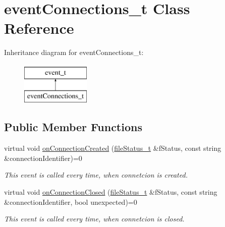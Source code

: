 \hypertarget{classeventConnections__t}{\section{event\-Connections\-\_\-t \-Class \-Reference}
\label{classeventConnections__t}
}
\-Inheritance diagram for event\-Connections\-\_\-t\-:\begin{figure}[H]
\begin{center}
\leavevmode
\includegraphics[height=2.000000cm]{classeventConnections__t}
\end{center}
\end{figure}
\subsection*{\-Public \-Member \-Functions}
\begin{DoxyCompactItemize}
\item 
virtual void \hyperlink{classeventConnections__t_a325741f899797da5c563ba8bc821daf5}{on\-Connection\-Created} (\hyperlink{classfileStatus__t}{file\-Status\-\_\-t} \&f\-Status, const string \&connection\-Identifier)=0
\begin{DoxyCompactList}\small\item\em \-This event is called every time, when connetcion is created. \end{DoxyCompactList}\item 
virtual void \hyperlink{classeventConnections__t_a05bdb89342abf9d5db832c568c408382}{on\-Connection\-Closed} (\hyperlink{classfileStatus__t}{file\-Status\-\_\-t} \&f\-Status, const string \&connection\-Identifier, bool unexpected)=0
\begin{DoxyCompactList}\small\item\em \-This event is called every time, when connetcion is closed. \end{DoxyCompactList}\end{DoxyCompactItemize}


